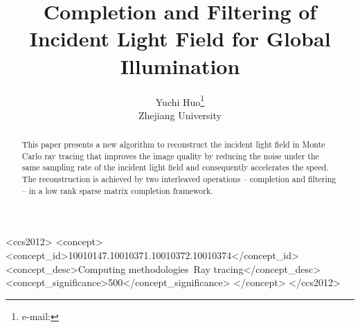 \documentclass[review]{acmsiggraph}
\title{Completion and Filtering of Incident Light Field for Global Illumination}
\author{Yuchi Huo\thanks{e-mail:}\\Zhejiang University}
\begin{document}


\maketitle

\begin{abstract}

This paper presents a new algorithm to reconstruct the incident light field in Monte Carlo ray tracing that improves the image quality by reducing the noise under the same sampling rate of the incident light field and consequently accelerates the speed. The reconstruction is achieved by two interleaved operations -- completion and filtering -- in a low rank sparse matrix completion framework. 

\end{abstract}

%
\begin{CCSXML}
<ccs2012>
<concept>
<concept_id>10010147.10010371.10010372.10010374</concept_id>
<concept_desc>Computing methodologies~Ray tracing</concept_desc>
<concept_significance>500</concept_significance>
</concept>
</ccs2012>
\end{CCSXML}

%
%


\keywordlist

\conceptlist

\printcopyright
\end{document}
